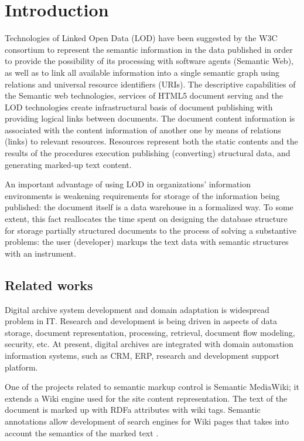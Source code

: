 \documentclass[12pt]{llncs}
\begin{document}
\section{Introduction}


Technologies of Linked Open Data (LOD) \cite{b1} have been suggested by
the W3C consortium to represent the semantic information in the data
published in order to provide the possibility of its processing with
software agents (Semantic Web), as well as to link all available
information into a single semantic graph using relations and universal
resource identifiers (URIs). The descriptive capabilities of the
Semantic web technologies, services of HTML5 document serving and the
LOD technologies create infrastructural basis of document publishing
with providing logical links between documents. The document content
information is associated with the content information of another one by
means of relations (links) to relevant resources. Resources represent
both the static contents and the results of the procedures execution
publishing (converting) structural data, and generating marked-up text
content.

An important advantage of using LOD in organizations' information
environments is weakening requirements for storage of the information
being published: the document itself is a data warehouse in a formalized
way. To some extent, this fact reallocates the time spent on designing
the database structure for storage partially structured documents to the
process of solving a substantive problems: the user (developer) markups
the text data with semantic structures with an instrument.

\subsection{Related works}
\label{sec:relwks}

Digital archive system development and domain adaptation is widespread
problem in IT.  Research and development is being driven in aspects of
data storage, document representation, processing, retrieval, document
flow modeling, security, etc.  At present, digital archives are integrated
with domain automation information systems, such as CRM, ERP, research and
development support platform.

One of the projects related to semantic markup control is Semantic MediaWiki; it extends a Wiki engine used for the site content representation. The text of the document is marked up with RDFa attributes with wiki tags. Semantic annotations allow development of search engines for Wiki pages that takes into account the semantics of the marked text \cite{c6}.
\end{document}
